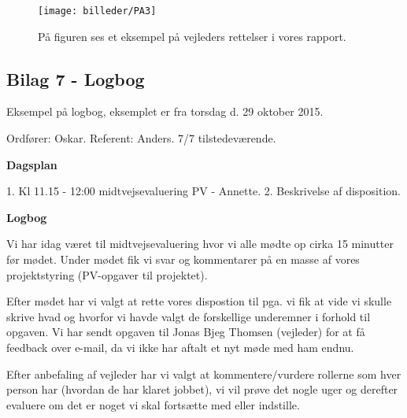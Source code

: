 \begin{figure}[H] 
\centering
\texttt{[image: billeder/PA3]}
\caption{På figuren ses et eksempel på vejleders rettelser i vores rapport.}
\label{fig:Sne1}
\end{figure}

\subsection{Bilag 7 - Logbog} \label{sec:Bilag7}

Eksempel på logbog, eksemplet er fra torsdag d. 29 oktober 2015.

Ordfører: Oskar.
Referent: Anders.
7/7 tilstedeværende.

\textbf{Dagsplan}

1. Kl 11.15 - 12:00 midtvejsevaluering PV - Annette.
2. Beskrivelse af disposition.

\textbf{Logbog}

Vi har idag været til midtvejsevaluering hvor vi alle mødte op cirka 15 minutter før mødet. Under mødet fik vi svar og kommentarer på en masse af vores projektstyring (PV-opgaver til projektet).

Efter mødet har vi valgt at rette vores dispostion til pga. vi fik at vide vi skulle skrive hvad og hvorfor vi havde valgt de forskellige underemner i forhold til opgaven. Vi har sendt opgaven til Jonas Bjeg Thomsen (vejleder) for at få feedback over e-mail, da vi ikke har aftalt et nyt møde med ham endnu.

Efter anbefaling af vejleder har vi valgt at kommentere/vurdere rollerne som hver person har (hvordan de har klaret jobbet), vi vil prøve det nogle uger og derefter evaluere om det er noget vi skal fortsætte med eller indstille.







